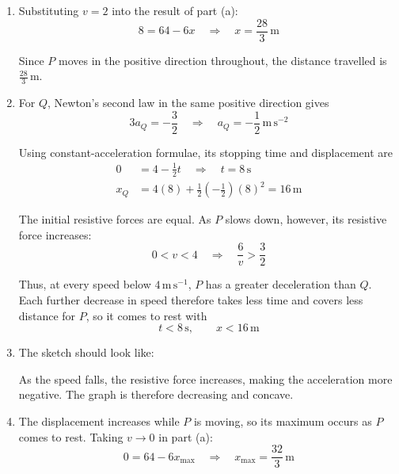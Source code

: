 \documentclass[leqno]{article}
\begin{document}
\begin{enumerate}[
  label=\textbf{\arabic*.},
  leftmargin=*,
  topsep=0pt,
  partopsep=0pt,
  parsep=0pt
]
\begin{djsSolution}
\begin{enumerate}[label=\textbf{(\alph*)}, start=1]
When \(x=0\), \(v=4\), so \(c=\frac{64}{3}\). Hence
\begin{align*}
v^3&=64-6x\\
v&=\sqrt[3]{64-6x}
\end{align*}

\item Substituting \(v=2\) into the result of part (a):
\[
8=64-6x
\quad\Longrightarrow\quad
x=\frac{28}{3}\,\mathrm{m}
\]

Since \(P\) moves in the positive direction throughout, the distance travelled is \(\frac{28}{3}\,\mathrm{m}\).

\item For \(Q\), Newton's second law in the same positive direction gives
\[
3a_Q=-\frac32
\quad\Longrightarrow\quad
a_Q=-\frac12\,\mathrm{m\,s^{-2}}
\]

Using constant-acceleration formulae, its stopping time and displacement are
\begin{align*}
0&=4-\frac12t
\quad\Longrightarrow\quad t=8\,\mathrm{s}\\
x_Q&=4(8)+\frac12\left(-\frac12\right)(8)^2=16\,\mathrm{m}
\end{align*}

The initial resistive forces are equal. As \(P\) slows down, however, its resistive force increases:
\[
0<v<4
\quad\Longrightarrow\quad
\frac6v>\frac32
\]

Thus, at every speed below \(4\,\mathrm{m\,s^{-1}}\), \(P\) has a greater deceleration than \(Q\). Each further decrease in speed therefore takes less time and covers less distance for \(P\), so it comes to rest with
\[
t<8\,\mathrm{s},\qquad x<16\,\mathrm{m}
\]

\item The sketch should look like:\par\nopagebreak


As the speed falls, the resistive force increases, making the acceleration more negative. The graph is therefore decreasing and concave.

\item The displacement increases while \(P\) is moving, so its maximum occurs as \(P\) comes to rest. Taking \(v\to0\) in part (a):
\[
0=64-6x_{\max}
\quad\Longrightarrow\quad
x_{\max}=\frac{32}{3}\,\mathrm{m}
\]
\end{enumerate}
\end{djsSolution}


\end{enumerate}
\end{document}
